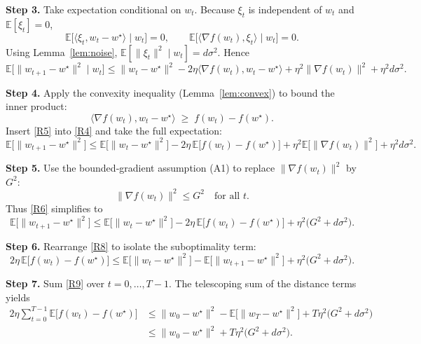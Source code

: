 \documentclass{article}
\newcommand{\E}{\mathbb{E}}
\begin{document}
\noindent\textbf{Step 3.}  Take expectation conditional on $w_t$.
Because $\xi_t$ is independent of $w_t$ and $\E[\xi_t]=0$,
\[
\E\big[\langle\xi_t,w_t-w^\star\rangle\mid w_t\big]=0,
\qquad
\E\big[\langle\nabla f(w_t),\xi_t\rangle\mid w_t\big]=0 .
\]
Using Lemma~\ref{lem:noise}, $\E[\|\xi_t\|^{2}\mid w_t]=d\sigma^{2}$.  Hence
\begin{equation}
\E\!\big[\|w_{t+1}-w^\star\|^{2}\mid w_t\big]
\le \|w_t-w^\star\|^{2}
-2\eta\langle\nabla f(w_t),w_t-w^\star\rangle
+\eta^{2}\|\nabla f(w_t)\|^{2}
+\eta^{2}d\sigma^{2}. \tag{R4}
\end{equation}

\noindent\textbf{Step 4.}  Apply the convexity inequality (Lemma~\ref{lem:convex}) to bound the inner product:
\[
\langle\nabla f(w_t),w_t-w^\star\rangle \;\ge\; f(w_t)-f(w^\star). \tag{R5}
\]
Insert \eqref{R5} into \eqref{R4} and take the full expectation:
\begin{equation}
\E\!\big[\|w_{t+1}-w^\star\|^{2}\big]
\le \E\!\big[\|w_t-w^\star\|^{2}\big]
-2\eta\,\E\!\big[f(w_t)-f(w^\star)\big]
+\eta^{2}\E\!\big[\|\nabla f(w_t)\|^{2}\big]
+\eta^{2}d\sigma^{2}. \tag{R6}
\end{equation}

\noindent\textbf{Step 5.}  Use the bounded‑gradient assumption (A1) to replace $\|\nabla f(w_t)\|^{2}$ by $G^{2}$:
\[
\|\nabla f(w_t)\|^{2}\le G^{2}\quad\text{for all }t. \tag{R7}
\]
Thus \eqref{R6} simplifies to
\begin{equation}
\E\!\big[\|w_{t+1}-w^\star\|^{2}\big]
\le \E\!\big[\|w_t-w^\star\|^{2}\big]
-2\eta\,\E\!\big[f(w_t)-f(w^\star)\big]
+\eta^{2}\big(G^{2}+d\sigma^{2}\big). \tag{R8}
\end{equation}

\noindent\textbf{Step 6.}  Rearrange \eqref{R8} to isolate the suboptimality term:
\begin{equation}
2\eta\,\E\!\big[f(w_t)-f(w^\star)\big]
\le \E\!\big[\|w_t-w^\star\|^{2}\big]
-\E\!\big[\|w_{t+1}-w^\star\|^{2}\big]
+\eta^{2}\big(G^{2}+d\sigma^{2}\big). \tag{R9}
\end{equation}

\noindent\textbf{Step 7.}  Sum \eqref{R9} over $t=0,\dots,T-1$.
The telescoping sum of the distance terms yields
\begin{align}
2\eta\sum_{t=0}^{T-1}\E\!\big[f(w_t)-f(w^\star)\big]
&\le \|w_0-w^\star\|^{2}
-\E\!\big[\|w_T-w^\star\|^{2}\big]
+T\eta^{2}\big(G^{2}+d\sigma^{2}\big) \nonumber\\
&\le \|w_0-w^\star\|^{2}
+T\eta^{2}\big(G^{2}+d\sigma^{2}\big). \tag{R10}
\end{align}
\end{document}
